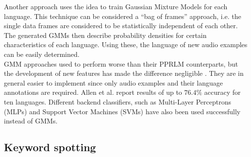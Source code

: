 Another approach uses the idea to train Gaussian Mixture Models for each language. This technique can be considered a ``bag of frames'' approach, i.e. the single data frames are considered to be statistically independent of each other. The generated GMMs then describe probability densities for certain characteristics of each language. Using these, the language of new audio examples can be easily determined.\\
GMM approaches used to perform worse than their PPRLM counterparts, but the development of new features has made the difference negligible \cite{singer}. They are in general easier to implement since only audio examples and their language annotations are required. Allen et al. \cite{allen} report results of up to $76.4\%$ accuracy for ten languages. Different backend classifiers, such as Multi-Layer Perceptrons (MLPs) and Support Vector Machines (SVMs) \cite{campbell} have also been used successfully instead of GMMs.

\subsection{Keyword spotting}




